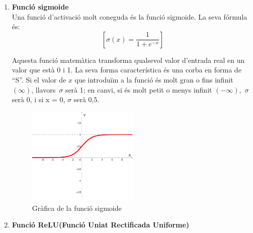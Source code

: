 \begin{enumerate}
 \item \label{sigmoide}{\textbf{Funció sigmoide}}\\
 Una funció d'activació molt coneguda és la funció sigmoide. La seva fórmula és:
$$[ \sigma(x) = \frac{1}{1 + e^{-x}} ]$$

Aquesta funció matemàtica transforma qualsevol valor d'entrada real en un valor que està 0 i 1. La seva forma característica és una corba en forma de ``S''. Si el valor de $x$ que introduïm a la funció és molt gran o fins infinit $(\infty)$, llavors\ $\sigma$ serà 1; en canvi, si és molt petit o menys infinit $(-\infty)$,\ $\sigma$ serà 0, i si x = 0,  $\sigma$  serà 0,5.

\begin{figure}[h!]
    \centering
    \includegraphics[width=0.5\textwidth]{./figures/grafica_sigmoide.png}
    \caption{Gràfica de la funció sigmoide}
\end{figure}

\item \hypertarget{subsec:1}{\textbf{Funció ReLU(Funció Uniat Rectificada Uniforme)}}\\


\end{enumerate}
